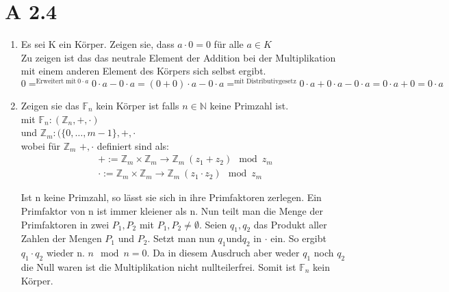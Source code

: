 \documentclass{article}
\begin{document}
        \section*{A 2.4}
            \begin{enumerate}[label= (\roman*)]
                \item Es sei K ein Körper. Zeigen sie, dass \(a \cdot 0 = 0\) für alle \(a \in K\) \\
                Zu zeigen ist das das neutrale Element der Addition bei der Multiplikation mit einem anderen Element des Körpers sich selbst ergibt.
                \begin{equation*}
                    0 =^{\text{Erweitert mit} \: 0 \cdot a} 0 \cdot a - 0 \cdot a = (0+0) \cdot a - 0 \cdot a =^{\text{mit Distributivgesetz}} 0 \cdot a + 0 \cdot a - 0 \cdot a
                    = 0 \cdot a + 0 = 0 \cdot a
                \end{equation*}

                \item Zeigen sie das \(\mathbb{F}_n\) kein Körper ist falls \(n \in \mathbb{N}\) keine Primzahl ist. \\
                mit \(\mathbb{F}_n: (\mathbb{Z}_n, +, \cdot) \) \\
                und \(\mathbb{Z}_m: (\{0, \dots, m-1\}, +, \cdot \) \\
                wobei für \(\mathbb{Z}_m\) \(+, \cdot \) definiert sind als: \\
                \begin{align*}
                    + := \mathbb{Z}_m \times \mathbb{Z}_m \to \mathbb{Z}_m \: (z_1 + z_2) \mod z_m \\
                    \cdot := \mathbb{Z}_m \times \mathbb{Z}_m \to \mathbb{Z}_m \: (z_1 \cdot z_2) \mod z_m
                \end{align*}
                

                Ist n keine Primzahl, so lässt sie sich in ihre Primfaktoren zerlegen. Ein Primfaktor von n ist immer kleiener als n.
                Nun teilt man die Menge der Primfaktoren in zwei \(P_1, P_2\) mit \(P_1, P_2 \neq \emptyset \). Seien \(q_1, q_2\) das Produkt aller Zahlen
                der Mengen \(P_1\) und \(P_2\). Setzt man nun \(q_1 \text{und} q_2\) in \(\cdot \) ein. So ergibt \(q_1 \cdot q_2\) wieder n. \(n \mod n = 0\).
                Da in diesem Ausdruch aber weder \(q_1\) noch \(q_2\) die Null waren ist die Multiplikation nicht nullteilerfrei.
                Somit ist \(\mathbb{F}_n\) kein Körper.
                

\end{enumerate}
\end{document}
